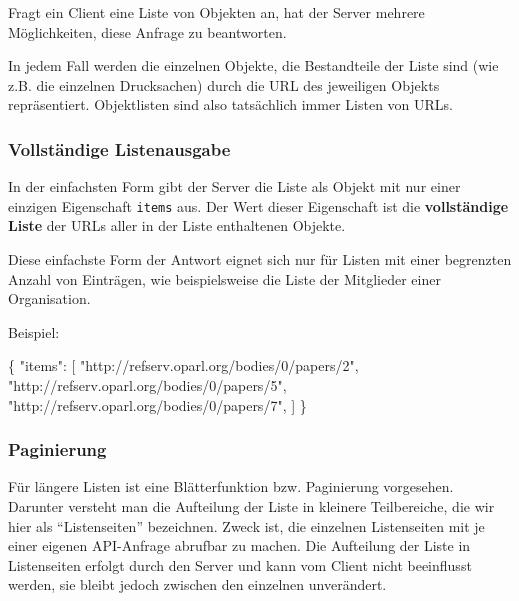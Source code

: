 \documentclass[,a4paper]{article}
\newenvironment{Shaded}{}{}
\newcommand{\DataTypeTok}[1]{\textcolor[rgb]{0.56,0.13,0.00}{{#1}}}
\newcommand{\StringTok}[1]{\textcolor[rgb]{0.25,0.44,0.63}{{#1}}}
\newcommand{\NormalTok}[1]{{#1}}
\begin{document}
Fragt ein Client eine Liste von Objekten an, hat der Server mehrere
Möglichkeiten, diese Anfrage zu beantworten.

In jedem Fall werden die einzelnen Objekte, die Bestandteile der Liste
sind (wie z.B. die einzelnen Drucksachen) durch die URL des jeweiligen
Objekts repräsentiert. Objektlisten sind also tatsächlich immer Listen
von URLs.

\subsubsection{Vollständige
Listenausgabe}\label{vollstuxe4ndige-listenausgabe}

In der einfachsten Form gibt der Server die Liste als Objekt mit nur
einer einzigen Eigenschaft \texttt{items} aus. Der Wert dieser
Eigenschaft ist die \textbf{vollständige Liste} der URLs aller in der
Liste enthaltenen Objekte.

Diese einfachste Form der Antwort eignet sich nur für Listen mit einer
begrenzten Anzahl von Einträgen, wie beispielsweise die Liste der
Mitglieder einer Organisation.

Beispiel:

\begin{Shaded}
\begin{Highlighting}[]
\NormalTok{\{}
    \DataTypeTok{"items"}\NormalTok{: [}
        \StringTok{"http://refserv.oparl.org/bodies/0/papers/2"}\NormalTok{,}
        \StringTok{"http://refserv.oparl.org/bodies/0/papers/5"}\NormalTok{,}
        \StringTok{"http://refserv.oparl.org/bodies/0/papers/7"}\NormalTok{,}
    \NormalTok{]}
\NormalTok{\}}
\end{Highlighting}
\end{Shaded}

\subsubsection{Paginierung}\label{paginierung}

Für längere Listen ist eine Blätterfunktion bzw. Paginierung vorgesehen.
Darunter versteht man die Aufteilung der Liste in kleinere Teilbereiche,
die wir hier als ``Listenseiten'' bezeichnen. Zweck ist, die einzelnen
Listenseiten mit je einer eigenen API-Anfrage abrufbar zu machen. Die
Aufteilung der Liste in Listenseiten erfolgt durch den Server und kann
vom Client nicht beeinflusst werden, sie bleibt jedoch zwischen den
einzelnen unverändert.
\end{document}
